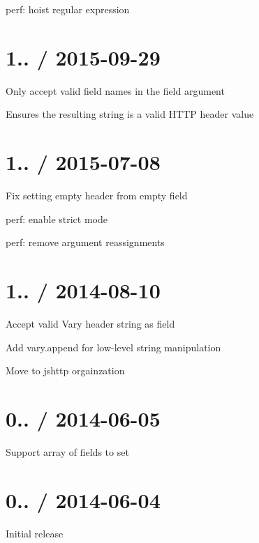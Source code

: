 
\begin{DoxyItemize}
\item perf\+: hoist regular expression
\end{DoxyItemize}

\section*{1.. / 2015-\/09-\/29 }


\begin{DoxyItemize}
\item Only accept valid field names in the {\ttfamily field} argument
\begin{DoxyItemize}
\item Ensures the resulting string is a valid H\+T\+TP header value
\end{DoxyItemize}
\end{DoxyItemize}

\section*{1.. / 2015-\/07-\/08 }


\begin{DoxyItemize}
\item Fix setting empty header from empty {\ttfamily field}
\item perf\+: enable strict mode
\item perf\+: remove argument reassignments
\end{DoxyItemize}

\section*{1.. / 2014-\/08-\/10 }


\begin{DoxyItemize}
\item Accept valid {\ttfamily Vary} header string as {\ttfamily field}
\item Add {\ttfamily vary.\+append} for low-\/level string manipulation
\item Move to {\ttfamily jshttp} orgainzation
\end{DoxyItemize}

\section*{0.. / 2014-\/06-\/05 }


\begin{DoxyItemize}
\item Support array of fields to set
\end{DoxyItemize}

\section*{0.. / 2014-\/06-\/04 }


\begin{DoxyItemize}
\item Initial release 
\end{DoxyItemize}